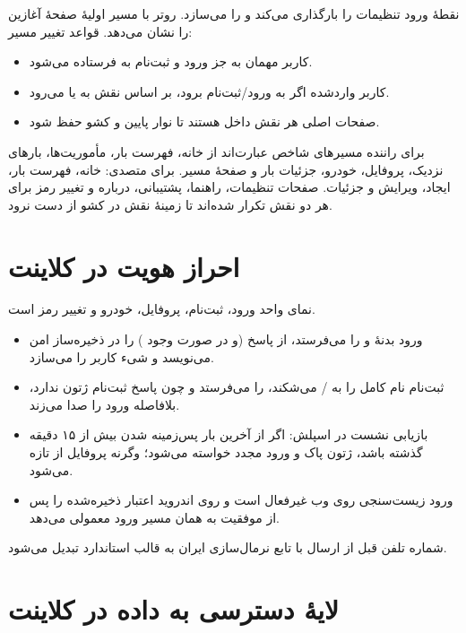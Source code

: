 نقطهٔ ورود  تنظیمات را بارگذاری می‌کند و  را می‌سازد. روتر با مسیر اولیهٔ \en{/} صفحهٔ آغازین را نشان می‌دهد. قواعد تغییر مسیر:

\begin{itemize}
  \item کاربر مهمان به جز ورود و ثبت‌نام به  فرستاده می‌شود.
  \item کاربر واردشده اگر به ورود/ثبت‌نام برود، بر اساس نقش به  یا  می‌رود.
  \item صفحات اصلی هر نقش داخل  هستند تا نوار پایین و کشو حفظ شود.
\end{itemize}

برای راننده مسیرهای شاخص عبارت‌اند از خانه، فهرست بار، مأموریت‌ها، بارهای نزدیک، پروفایل، خودرو، جزئیات بار و صفحهٔ مسیر. برای متصدی: خانه، فهرست بار، ایجاد، ویرایش و جزئیات. صفحات تنظیمات، راهنما، پشتیبانی، درباره و تغییر رمز برای هر دو نقش تکرار شده‌اند تا زمینهٔ نقش در کشو از دست نرود.

\section{احراز هویت در کلاینت}

 نمای واحد ورود، ثبت‌نام، پروفایل، خودرو و تغییر رمز است.

\begin{itemize}
  \item ورود بدنهٔ  و  را می‌فرستد، از پاسخ  (و در صورت وجود ) را در ذخیره‌ساز امن می‌نویسد و شیء کاربر را می‌سازد.
  \item ثبت‌نام نام کامل را به / می‌شکند،  را می‌فرستد و چون پاسخ ثبت‌نام ژتون ندارد، بلافاصله ورود را صدا می‌زند.
  \item بازیابی نشست در اسپلش: اگر از آخرین بار پس‌زمینه شدن بیش از ۱۵ دقیقه گذشته باشد، ژتون پاک و ورود مجدد خواسته می‌شود؛ وگرنه پروفایل از  تازه می‌شود.
  \item ورود زیست‌سنجی روی وب غیرفعال است و روی اندروید اعتبار ذخیره‌شده را پس از موفقیت  به همان مسیر ورود معمولی می‌دهد.
\end{itemize}

شماره تلفن قبل از ارسال با تابع نرمال‌سازی ایران به قالب استاندارد تبدیل می‌شود.

\section{لایهٔ دسترسی به داده در کلاینت}

